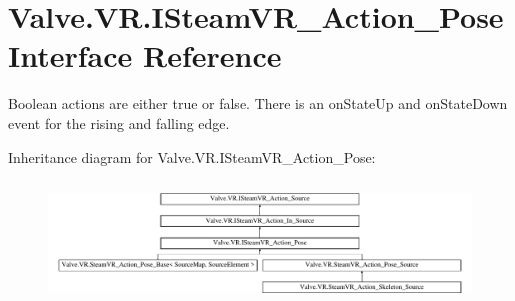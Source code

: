 \hypertarget{interface_valve_1_1_v_r_1_1_i_steam_v_r___action___pose}{}\section{Valve.\+V\+R.\+I\+Steam\+V\+R\+\_\+\+Action\+\_\+\+Pose Interface Reference}
\label{interface_valve_1_1_v_r_1_1_i_steam_v_r___action___pose}


Boolean actions are either true or false. There is an on\+State\+Up and on\+State\+Down event for the rising and falling edge.  


Inheritance diagram for Valve.\+V\+R.\+I\+Steam\+V\+R\+\_\+\+Action\+\_\+\+Pose\+:\begin{figure}[H]
\begin{center}
\leavevmode
\includegraphics[height=3.286385cm]{interface_valve_1_1_v_r_1_1_i_steam_v_r___action___pose}
\end{center}
\end{figure}
